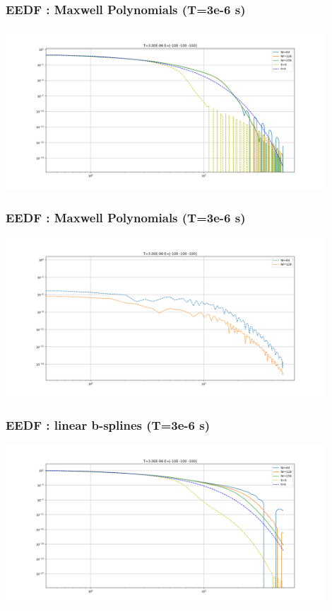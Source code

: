 \documentclass[mathserif, aspectratio=169]{beamer}
\begin{document}
\begin{frame}
	\frametitle{EEDF : Maxwell Polynomials (T=3e-6 s)}
	\begin{center}
		\includegraphics[width=0.9\textwidth]{figures/g0_3_maxwell_eedf.png}
	\end{center}
\end{frame}

\begin{frame}
	\frametitle{EEDF : Maxwell Polynomials (T=3e-6 s)}
	\begin{center}
		\includegraphics[width=0.9\textwidth]{figures/g0_3_maxwell_eedf_conv.png}
	\end{center}
\end{frame}

\begin{frame}
	\frametitle{EEDF : linear b-splines (T=3e-6 s)}
	\begin{center}
		\includegraphics[width=0.9\textwidth]{figures/g0_3_bspline_eedf.png}
	\end{center}
\end{frame}
\end{document}
